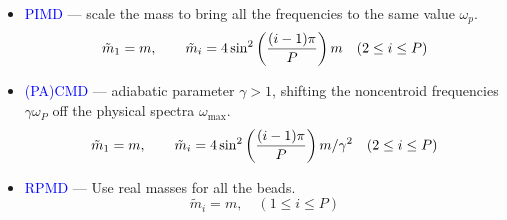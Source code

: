 \begin{frame}
  \begin{itemize}
  \item \textcolor{blue}{{PIMD}} --- scale the mass to bring all the frequencies
    to the same value $\omega_p$.
    \begin{equation*}
      \tilde{m}_1 = m, \qquad \tilde{m}_i = 4\sin^2\left({(i-1)\pi\over
          P}\right) m \quad (2 \le i \le P)
    \end{equation*}
  \item \textcolor{blue}{{(PA)CMD}} --- adiabatic parameter $\gamma > 1$,
    shifting the noncentroid frequencies $\gamma\omega_P$ off the physical
    spectra $\omega_{\text{max}}$.
    \begin{equation*}
      \tilde{m}_1 = m, \qquad \tilde{m}_i = 4\sin^2\left({(i-1)\pi\over
          P}\right) m / \gamma^2 \quad (2 \le i \le P)
    \end{equation*}
  \item \textcolor{blue}{{RPMD}} --- Use real masses for all the beads.
    \begin{equation*}
      \tilde{m}_i = m, \quad (1 \le i \le P)
    \end{equation*}
  \end{itemize}
\end{frame}
